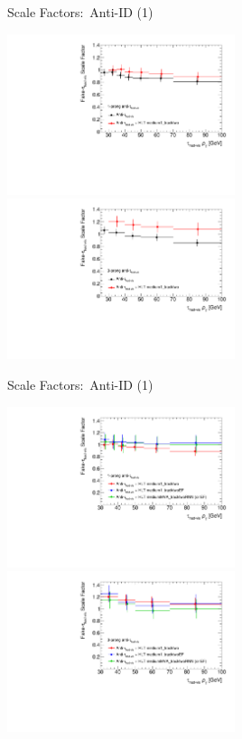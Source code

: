 \documentclass[11pt, xcolor={dvipsnames}, aspectratio=169, notes]{beamer}
\begin{document}
\begin{frame}{Scale Factors:\ Anti-ID (1)}
  \centering

  \includegraphics[width=0.5\textwidth]{ttbarSF/scale_factors/ttbarSF_antitau_offl_tau25_1p}%
  \includegraphics[width=0.5\textwidth]{ttbarSF/scale_factors/ttbarSF_antitau_offl_tau25_3p}
\end{frame}


\begin{frame}{Scale Factors:\ Anti-ID (1)}
  \centering

  \includegraphics[width=0.5\textwidth]{ttbarSF/scale_factors/ttbarSF_antitau_tau25_1p}%
  \includegraphics[width=0.5\textwidth]{ttbarSF/scale_factors/ttbarSF_antitau_tau25_3p}
\end{frame}
\end{document}
